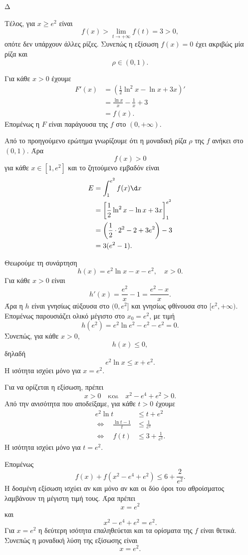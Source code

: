 \begin{thema}{Δ}
\begin{erwthma}
Τέλος, για $x\geq e^2$ είναι
\[
f(x)>\lim_{t\to+\infty}f(t)=3>0,
\]
οπότε δεν υπάρχουν άλλες ρίζες. Συνεπώς η εξίσωση $f(x)=0$ έχει ακριβώς μία ρίζα και
\[
{\rho\in(0,1)}.
\]

\item Για κάθε $x>0$ έχουμε
\begin{align*}
F'(x)
&=\left(\frac{1}{2}\ln^2x-\ln x+3x\right)'\\
&=\frac{\ln x}{x}-\frac{1}{x}+3\\
&=f(x).
\end{align*}
Επομένως η $F$ είναι παράγουσα της $f$ στο $(0,+\infty)$.

Από το προηγούμενο ερώτημα γνωρίζουμε ότι η μοναδική ρίζα $\rho$ της $f$ ανήκει στο $(0,1)$. Άρα
\[
f(x)>0
\]
για κάθε $x\in[1,e^2]$ και το ζητούμενο εμβαδόν είναι
\begin{align*}
E
&=\int_1^{e^2}f(x)\d x\\
&=\left[\frac{1}{2}\ln^2x-\ln x+3x\right]_1^{e^2}\\
&=\left(\frac{1}{2}\cdot 2^2-2+3e^2\right)-3\\
&={3(e^2-1)}.
\end{align*}

\item Θεωρούμε τη συνάρτηση
\[
h(x)=e^2\ln x-x-e^2,\quad x>0.
\]
Για κάθε $x>0$ είναι
\[
h'(x)=\frac{e^2}{x}-1=\frac{e^2-x}{x}.
\]
Άρα η $h$ είναι γνησίως αύξουσα στο $(0,e^2]$ και γνησίως φθίνουσα στο $[e^2,+\infty)$. Επομένως παρουσιάζει ολικό μέγιστο στο $x_0=e^2$, με τιμή
\[
h(e^2)=e^2\ln e^2-e^2-e^2=0.
\]
Συνεπώς, για κάθε $x>0$,
\[
h(x)\leq0,
\]
δηλαδή
\[
{e^2\ln x\leq x+e^2}.
\]
Η ισότητα ισχύει μόνο για $x=e^2$.

Για να ορίζεται η εξίσωση, πρέπει
\[
x>0
\quad\text{και}\quad
x^2-e^4+e^2>0.
\]
Από την ανισότητα που αποδείξαμε, για κάθε $t>0$ έχουμε
\begin{align*}
e^2\ln t&\leq t+e^2\\
\Leftrightarrow\quad
\frac{\ln t-1}{t}&\leq\frac{1}{e^2}\\
\Leftrightarrow\quad
f(t)&\leq3+\frac{1}{e^2}.
\end{align*}
Η ισότητα ισχύει μόνο για $t=e^2$.

Επομένως
\[
f(x)+f(x^2-e^4+e^2)
\leq6+\frac{2}{e^2}.
\]
Η δοσμένη εξίσωση ισχύει αν και μόνο αν και οι δύο όροι του αθροίσματος λαμβάνουν τη μέγιστη τιμή τους. Άρα πρέπει
\[
x=e^2
\]
και
\[
x^2-e^4+e^2=e^2.
\]
Για $x=e^2$ η δεύτερη ισότητα επαληθεύεται και τα ορίσματα της $f$ είναι θετικά. Συνεπώς η μοναδική λύση της εξίσωσης είναι
\[
{x=e^2}.
\]
\end{erwthma}
\end{thema}

